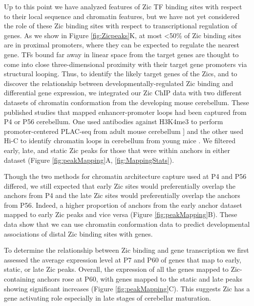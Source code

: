\documentclass[fleqn,10pt]{wlscirep}
\begin{document}
Up to this point we have analyzed features of Zic TF binding sites with respect to their local sequence and chromatin features, but we have not yet considered the role of these Zic binding sites with respect to transcriptional regulation of genes. As we show in Figure \ref{fig:Zicpeaks}K, at most \textless 50\% of Zic binding sites are in proximal promoters, where they can be expected to regulate the nearest gene. TFs bound far away in linear space from the target genes are thought to come into close three-dimensional proximity with their target gene promoters via structural looping. Thus, to identify the likely target genes of the Zics, and to discover the relationship between developmentally-regulated Zic binding and differential gene expression, we integrated our Zic ChIP data with two different datasets of chromatin conformation \cite{Yamada2019SensoryLearning,Goodman2019RegulationRemodeling} from the developing mouse cerebellum. These published studies that mapped enhancer-promoter loops  had been captured from P4 or P56 cerebellum. One used antibodies against H3K4me3 to perform promoter-centered PLAC-seq from adult mouse cerebellum \cite{Yamada2019SensoryLearning} ] and the other used Hi-C to identify chromatin loops in cerebellum from young mice \cite{Goodman2019RegulationRemodeling}. We filtered early, late, and static Zic peaks for those that were within anchors in either dataset (Figure \ref{fig:peakMapping}A, \ref{fig:MappingStats}). 

Though the two methods for chromatin architecture capture used at P4 and P56 differed, we still expected that early Zic sites would preferentially overlap the anchors from P4 and the late Zic sites would preferentially overlap the anchors from P56. Indeed, a higher proportion of anchors from the early anchor dataset mapped to early Zic peaks and vice versa (Figure \ref{fig:peakMapping}B). These data show that we can use chromatin conformation data to predict developmental associations of distal Zic binding sites with genes. 

To determine the relationship between Zic binding and gene transcription we first assessed the average expression level at P7 and P60 of genes that map to early, static, or late Zic peaks. Overall, the expression of all the genes mapped to Zic-containing anchors rose at P60, with genes mapped to the static and late peaks showing significant increases (Figure \ref{fig:peakMapping}C). This suggests Zic has a gene activating role especially in late stages of cerebellar maturation.  
\end{document}
